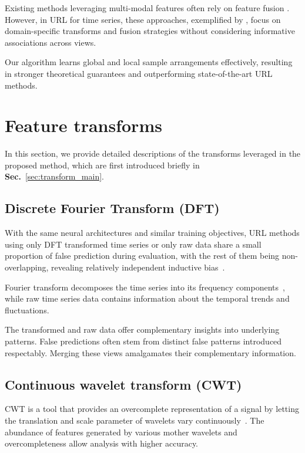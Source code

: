 Existing methods leveraging multi-modal features often rely on feature fusion \cite{yang2022unsupervised, tang2020interpretable}. However, in URL for time series, these approaches, exemplified by \cite{yang2022unsupervised}, focus on domain-specific transforms and fusion strategies without considering informative associations across views. 

Our algorithm learns global and local sample arrangements effectively, resulting in stronger theoretical guarantees and outperforming state-of-the-art URL methods.

\section{Feature transforms}\label{sec:transforms}

In this section, we provide detailed descriptions of the transforms leveraged in the proposed method, which are first introduced briefly in \textbf{Sec.}~\ref{sec:transform_main}.

\subsection{Discrete Fourier Transform (DFT)}

With the same neural architectures and similar training objectives, URL methods using only DFT transformed time series or only raw data share a small proportion of false prediction during evaluation, with the rest of them being non-overlapping, revealing relatively independent inductive bias~\cite{yang2022unsupervised}. 

Fourier transform decomposes the time series into its frequency components~\cite{winograd1978computing}, while raw time series data contains information about the temporal trends and fluctuations.


The transformed and raw data offer complementary insights into underlying patterns. False predictions often stem from distinct false patterns introduced respectably. Merging these views amalgamates their complementary information.

\subsection{Continuous wavelet transform (CWT)}

CWT is a tool that provides an overcomplete representation of a signal by letting the translation and scale parameter of wavelets vary continuously~\cite{grossmann1990reading}. The abundance of features generated by various mother wavelets and overcompleteness allow analysis with higher accuracy. 


